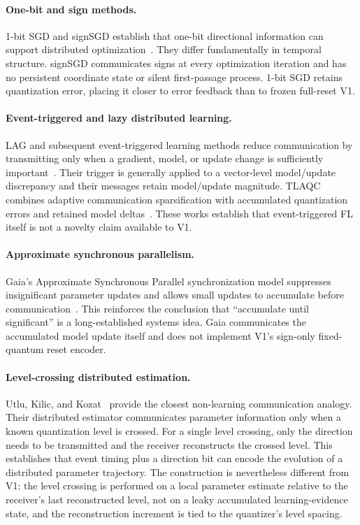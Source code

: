 \paragraph{One-bit and sign methods.}
1-bit SGD and signSGD establish that one-bit directional information can support distributed optimization~\cite{seide2014onebit,bernstein2018signsgd}. They differ fundamentally in temporal structure. signSGD communicates signs at every optimization iteration and has no persistent coordinate state or silent first-passage process. 1-bit SGD retains quantization error, placing it closer to error feedback than to frozen full-reset V1.

\paragraph{Event-triggered and lazy distributed learning.}
LAG and subsequent event-triggered learning methods reduce communication by transmitting only when a gradient, model, or update change is sufficiently important~\cite{chen2018lag,yoon2025etfl}. Their trigger is generally applied to a vector-level model/update discrepancy and their messages retain model/update magnitude. TLAQC combines adaptive communication sparsification with accumulated quantization errors and retained model deltas~\cite{ren2023tlaqc}. These works establish that event-triggered FL itself is not a novelty claim available to V1.

\paragraph{Approximate synchronous parallelism.}
Gaia's Approximate Synchronous Parallel synchronization model suppresses insignificant parameter updates and allows small updates to accumulate before communication~\cite{hsieh2017gaia}. This reinforces the conclusion that ``accumulate until significant'' is a long-established systems idea. Gaia communicates the accumulated model update itself and does not implement V1's sign-only fixed-quantum reset encoder.

\paragraph{Level-crossing distributed estimation.}
Utlu, Kilic, and Kozat~\cite{utlu2017level} provide the closest non-learning communication analogy. Their distributed estimator communicates parameter information only when a known quantization level is crossed. For a single level crossing, only the direction needs to be transmitted and the receiver reconstructs the crossed level. This establishes that event timing plus a direction bit can encode the evolution of a distributed parameter trajectory. The construction is nevertheless different from V1: the level crossing is performed on a local parameter estimate relative to the receiver's last reconstructed level, not on a leaky accumulated learning-evidence state, and the reconstruction increment is tied to the quantizer's level spacing.

